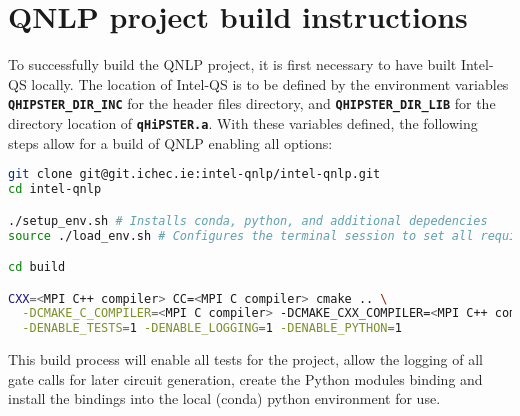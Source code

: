 \section{QNLP project build instructions}\label{app:build_instr}
To successfully build the QNLP project, it is first necessary to have built Intel-QS locally. The location of Intel-QS is to be defined by the environment variables \textbf{\texttt{QHIPSTER\_DIR\_INC}} for the header files directory, and \textbf{\texttt{QHIPSTER\_DIR\_LIB}} for the directory location of \textbf{\texttt{qHiPSTER.a}}. With these variables defined, the following steps allow for a build of QNLP enabling all options:

\begin{lstlisting}[language=bash, caption=QNLP build instructions. Replace <> tags with respective paths.]
git clone git@git.ichec.ie:intel-qnlp/intel-qnlp.git
cd intel-qnlp

./setup_env.sh # Installs conda, python, and additional depedencies
source ./load_env.sh # Configures the terminal session to set all required paths

cd build

CXX=<MPI C++ compiler> CC=<MPI C compiler> cmake .. \
  -DCMAKE_C_COMPILER=<MPI C compiler> -DCMAKE_CXX_COMPILER=<MPI C++ compiler> \
  -DENABLE_TESTS=1 -DENABLE_LOGGING=1 -DENABLE_PYTHON=1
\end{lstlisting}

This build process will enable all tests for the project, allow the logging of all gate calls for later circuit generation, create the Python modules binding and install the bindings into the local (conda) python environment for use.
\clearpage